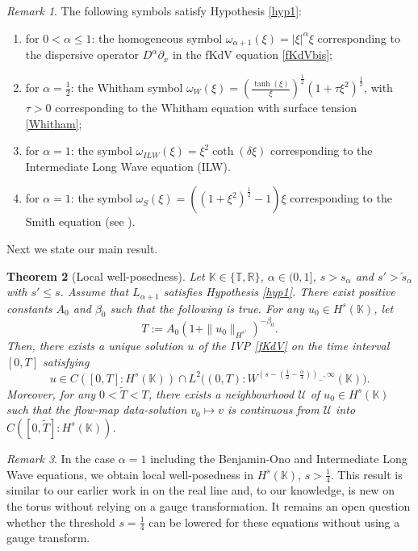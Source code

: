 \documentclass{amsart}
\newtheorem{theorem}{Theorem}[section]
\theoremstyle{definition}
\theoremstyle{remark}
\newtheorem{remark}[theorem]{Remark}
\def\R{{\mathbb R}}
\def\K{{\mathbb K}}
\newcommand{\T}{\mathbb{T}}
\numberwithin{equation}{section}
\begin{document}
\begin{remark}The following symbols satisfy Hypothesis \ref{hyp1}:
\begin{enumerate}
\item for $0<\alpha \le 1$: the homogeneous symbol $\omega_{\alpha+1}(\xi)=|\xi|^{\alpha}\xi$  corresponding to the dispersive operator $D^{\alpha}\partial_x$ in the fKdV equation \eqref{fKdVbis}; 
\item for $\alpha=\frac12$: the Whitham symbol $\omega_W(\xi)= \left( \frac{\tanh (\xi)}{\xi}\right)^{\frac12} (1+\tau \xi^2)^{\frac12}$, with $\tau>0$ corresponding to the Whitham equation with surface tension \eqref{Whitham}; 
\item for $\alpha=1$: the symbol $\omega_{ILW}(\xi)=\xi^2\coth(\delta \xi)$ corresponding to the Intermediate Long Wave equation (ILW). 
\item for $\alpha=1$: the symbol $\omega_S(\xi)=\left(\left(1+\xi^2 \right)^{\frac12}-1\right)\xi$ corresponding to the Smith equation (see \cite{Smith}).
\end{enumerate}
\end{remark}

Next we state our main result. 
\begin{theorem}[Local well-posedness]\label{th:main}
  Let $\K\in\{\T, \R\}$, $\alpha\in (0,1]$, $s>s_\alpha$ and $s'>\widetilde{s}_\alpha$ with $s' \le s$. Assume that $L_{\alpha+1}$ satisfies Hypothesis \ref{hyp1}. There exist positive constants $A_0$ and $\beta_0$ such that the following is true. For any $u_0\in H^s(\K)$, let  
  \begin{equation*}
  T:=A_0 (1+\|u_0\|_{H^{s'}})^{-\beta_0} .
  \end{equation*} 
  Then, there exists a unique solution $u$ of the IVP \eqref{fKdV} on the time interval $[0, T]$ satisfying
\begin{equation} \label{th:main.1}
  u\in C([0, T] : H^s(\K))\cap L^2\big((0,T) : W^{(s-(\frac12-\frac \alpha 4))_-,\infty}(\K) \big).
 \end{equation}
 Moreover, for any $0<\widetilde{T}<T$, there exists a neighbourhood $\mathcal{U}$ of $u_0 \in H^s(\mathbb K)$ such that the flow-map data-solution $v_0\mapsto v$ is continuous from $\mathcal{U}$ into $C([0, \widetilde{T}] : H^s(\K))$.
\end{theorem}


\begin{remark}
In the case $\alpha=1$ including the Benjamin-Ono and Intermediate Long Wave equations, we obtain local well-posedness in $H^s(\K)$, $s>\frac14$. This result is similar to our earlier work in \cite{MPV} on the real line and, to our knowledge, is new on the torus without relying on a gauge transformation.  It remains an open question whether the threshold $s=\frac14$ can be lowered for these equations without using a gauge transform. 
\end{remark}
\end{document}
